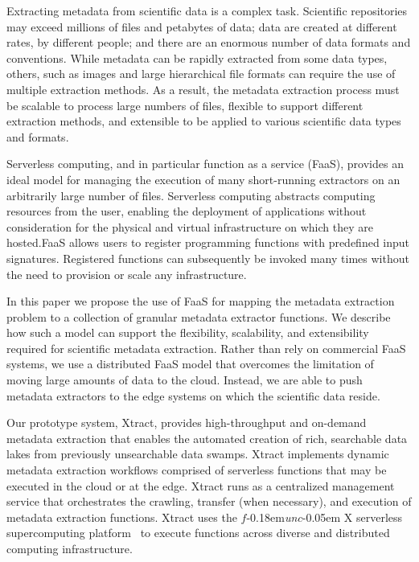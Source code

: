 \documentclass[sigconf]{acmart}
\newcommand{\name}{Xtract}
\newcommand{\funcx}{$f$\kern-0.18em\emph{unc}\kern-0.05em X}
\begin{document}
Extracting metadata from scientific data is a complex task. 
Scientific repositories may exceed millions of files and petabytes of data;
data are created at different rates, by different people; 
and there are an enormous number of data formats and conventions. 
While metadata can be rapidly extracted from some data types, others, such as
images and large hierarchical file formats can require the use of multiple extraction methods.  
As a result, the metadata extraction process must be scalable to process large numbers
of files, flexible to support different extraction methods, and extensible
to be applied to various scientific data types and formats.

Serverless computing, and in particular function as a service (FaaS),
provides an ideal model for managing the execution of
many short-running extractors on an arbitrarily large number of files. 
Serverless computing abstracts computing resources from the user, enabling
the deployment of applications without consideration for the physical and virtual infrastructure on which 
they are hosted.FaaS allows users to register programming functions with predefined input signatures. 
Registered functions can subsequently be invoked many times
without the need to provision or scale any infrastructure.

In this paper we propose the use of FaaS for mapping the metadata extraction problem to a 
collection of granular metadata extractor functions. 
We describe how such a model can support the flexibility, scalability, and extensibility required
for scientific metadata extraction. 
Rather than rely on commercial FaaS systems, we use a distributed FaaS model 
that overcomes the limitation of moving large amounts of data to the cloud. 
Instead, we are able to push
metadata extractors to the edge systems on which the scientific data reside. 

Our prototype system, \name{}, provides high-throughput and on-demand metadata 
extraction that enables the automated creation of rich, searchable data lakes from previously unsearchable data swamps. 
\name{} implements dynamic metadata extraction workflows comprised of serverless functions that may be 
executed in the cloud or at the edge. \name{} runs as a centralized management
service that orchestrates the crawling, transfer (when necessary), and execution of 
metadata extraction functions. %
\name{} uses the \funcx{} serverless supercomputing platform~\cite{chard2019serverless}
to execute functions across diverse and distributed computing infrastructure.
\end{document}
